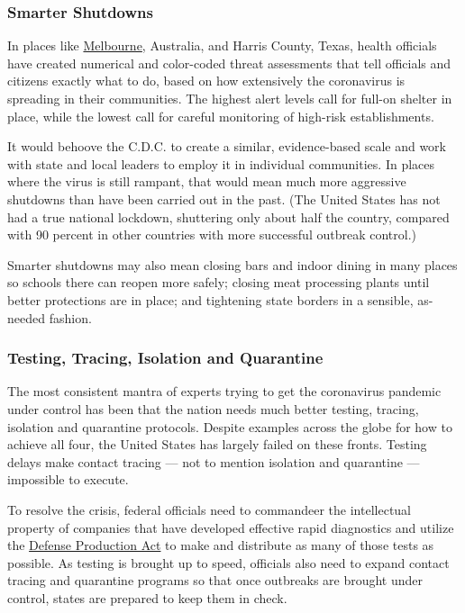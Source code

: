 \hypertarget{smarter-shutdowns}{%
\subsubsection{Smarter Shutdowns}\label{smarter-shutdowns}}

In places like
\href{https://www.nytimes.com/2020/08/04/world/australia/coronavirus-melbourne-lockdown.html}{Melbourne},
Australia, and Harris County, Texas, health officials have created
numerical and color-coded threat assessments that tell officials and
citizens exactly what to do, based on how extensively the coronavirus is
spreading in their communities. The highest alert levels call for
full-on shelter in place, while the lowest call for careful monitoring
of high-risk establishments.

It would behoove the C.D.C. to create a similar, evidence-based scale
and work with state and local leaders to employ it in individual
communities. In places where the virus is still rampant, that would mean
much more aggressive shutdowns than have been carried out in the past.
(The United States has not had a true national lockdown, shuttering only
about half the country, compared with 90 percent in other countries with
more successful outbreak control.)

Smarter shutdowns may also mean closing bars and indoor dining in many
places so schools there can reopen more safely; closing meat processing
plants until better protections are in place; and tightening state
borders in a sensible, as-needed fashion.

\hypertarget{testing-tracing-isolation-and-quarantine}{%
\subsubsection{Testing, Tracing, Isolation and
Quarantine}\label{testing-tracing-isolation-and-quarantine}}

The most consistent mantra of experts trying to get the coronavirus
pandemic under control has been that the nation needs much better
testing, tracing, isolation and quarantine protocols. Despite examples
across the globe for how to achieve all four, the United States has
largely failed on these fronts. Testing delays make contact tracing ---
not to mention isolation and quarantine --- impossible to execute.

To resolve the crisis, federal officials need to commandeer the
intellectual property of companies that have developed effective rapid
diagnostics and utilize the
\href{https://www.nytimes.com/2020/07/22/us/politics/coronavirus-defense-production-act.html}{Defense
Production Act} to make and distribute as many of those tests as
possible. As testing is brought up to speed, officials also need to
expand contact tracing and quarantine programs so that once outbreaks
are brought under control, states are prepared to keep them in check.

